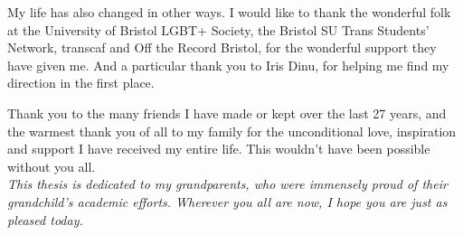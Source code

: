 My life has also changed in other ways. I would like to thank the wonderful folk at the University of Bristol LGBT+ Society, the Bristol SU Trans Students' Network, transcaf and Off the Record Bristol, for the wonderful support they have given me. And a particular thank you to Iris Dinu, for helping me find my direction in the first place.

Thank you to the many friends I have made or kept over the last 27 years, and the warmest thank you of all to my family for the unconditional love, inspiration and support I have received my entire life. This wouldn't have been possible without you all.\\

\emph{This thesis is dedicated to my grandparents, who were immensely proud of their grandchild's academic efforts. Wherever you all are now, I hope you are just as pleased today.}

